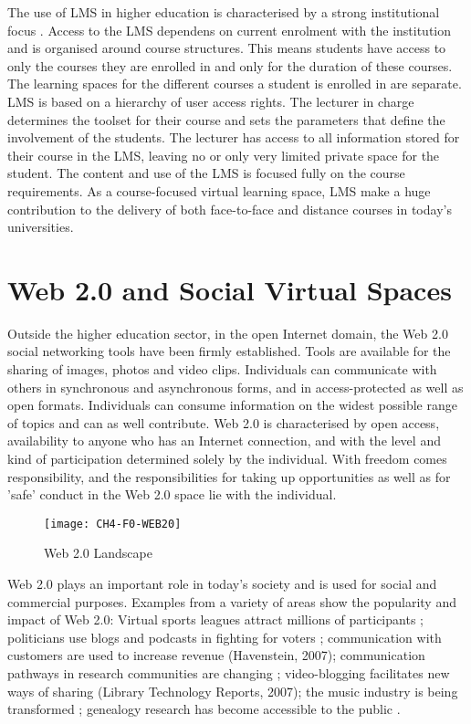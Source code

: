 The use of LMS in higher education is characterised by a strong institutional
focus \citep{Siemens2004}. Access to the LMS dependens on current enrolment
with the institution and is organised around course structures. This means
students have access to only the courses they are enrolled in and only for the
duration of these courses. The learning spaces for the different courses a
student is enrolled in are separate. LMS is based on a hierarchy of user access
rights. The lecturer in charge determines the toolset for their course and sets
the parameters that define the involvement of the students. The lecturer has
access to all information stored for their course in the LMS, leaving no or only
very limited private space for the student. The content and use of the LMS is
focused fully on the course requirements. As a course-focused virtual learning
space, LMS make a huge contribution to the delivery of both face-to-face and
distance courses in today's universities.

\section{Web 2.0 and Social Virtual Spaces}
Outside the higher education sector, in the open Internet domain, the Web 2.0
social networking tools have been firmly established. Tools are available for
the sharing of images, photos and video clips. Individuals can communicate with
others in synchronous and asynchronous forms, and in access-protected as well as
open formats. Individuals can consume information on the widest possible range
of topics and can as well contribute. Web 2.0 is characterised by open access,
availability to anyone who has an Internet connection, and with the level and
kind of participation determined solely by the individual. With freedom comes
responsibility, and the responsibilities for taking up opportunities as well as
for 'safe' conduct in the Web 2.0 space lie with the individual.


\begin{figure}[htb]
\centering
\texttt{[image: CH4-F0-WEB20]}
\caption[Web 2.0 Landscape]{Web 2.0 Landscape \citep{Dawson2007}}
\label{fig:web20l}
\end{figure}

Web 2.0 plays an important role in today's society and is used for social and
commercial purposes. Examples from a variety of areas show the popularity and
impact of Web 2.0: Virtual sports leagues attract millions of participants
\citep{Holahan2006}; politicians use blogs and podcasts in fighting for
voters \citep{Capell2006}; communication with customers are used to increase
revenue (Havenstein, 2007); communication pathways in research communities are
changing \citep{Ashling2007}; video-blogging facilitates new ways of sharing
(Library Technology Reports, 2007); the music industry is being transformed
\citep{Holahan2007}; genealogy research has become accessible to the public
\citep{MacMillan2007}.

